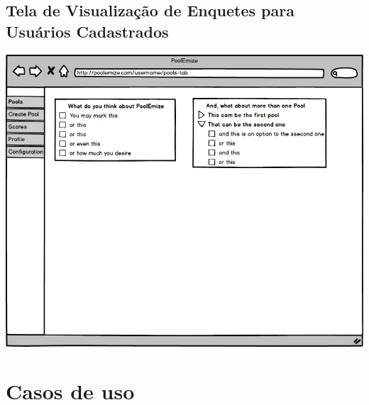 \documentclass[a4paper,12pt]{report}
\begin{document}
\subsection*{Tela de Visualização de Enquetes para Usuários Cadastrados}
\markright{}
\includegraphics[width=14.3cm]{mockups/PoollsTab.png}

\newpage
\section*{Casos de uso}
\markright{}
\end{document}
